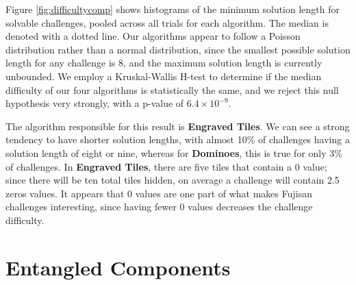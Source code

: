 \documentclass[journal]{IEEEtran}
\begin{document}
Figure \ref{fig:difficultycomp} shows histograms of the minimum solution length for solvable challenges, pooled across all trials for each algorithm. The median is denoted with a dotted line. Our algorithms appear to follow a Poisson distribution rather than a normal distribution, since the smallest possible solution length for any challenge is 8, and the maximum solution length is currently unbounded. We employ a Kruskal-Wallis H-test \cite{KRUSKAL} to determine if the median difficulty of our four algorithms is statistically the same, and we reject this null hypothesis very strongly, with a p-value of $6.4 \times 10^{-9}$.

The algorithm responsible for this result is {\bf Engraved Tiles}. We can see a strong tendency to have shorter solution lengths, with almost 10\% of challenges having a solution length of eight or nine, whereas for {\bf Dominoes}, this is true for only 3\% of challenges. In {\bf Engraved Tiles}, there are five tiles that contain a 0 value; since there will be ten total tiles hidden, on average a challenge will contain 2.5 zeros values. It appears that 0 values are one part of what makes Fujisan challenges interesting, since having fewer 0 values decreases the challenge difficulty.




\section{Entangled Components}



\end{document}
